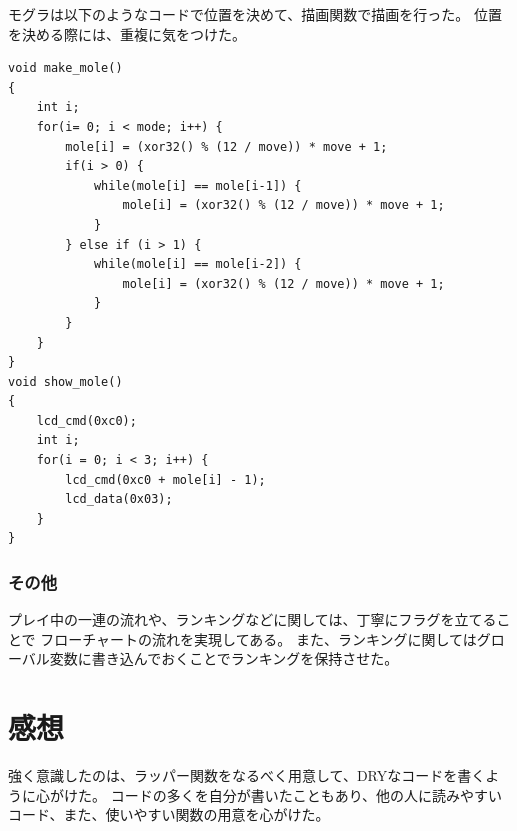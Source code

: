 \documentclass[11pt,a4j]{jsarticle}
\begin{document}
モグラは以下のようなコードで位置を決めて、描画関数で描画を行った。
位置を決める際には、重複に気をつけた。

\begin{lstlisting}[basicstyle=\ttfamily\footnotesize, frame=single]
void make_mole()
{
	int i;
	for(i= 0; i < mode; i++) {
		mole[i] = (xor32() % (12 / move)) * move + 1;
		if(i > 0) {
			while(mole[i] == mole[i-1]) {
				mole[i] = (xor32() % (12 / move)) * move + 1;
			}
		} else if (i > 1) {
			while(mole[i] == mole[i-2]) {
				mole[i] = (xor32() % (12 / move)) * move + 1;
			}
		}
	}
}
void show_mole()
{
	lcd_cmd(0xc0);
	int i;
	for(i = 0; i < 3; i++) {
		lcd_cmd(0xc0 + mole[i] - 1);
		lcd_data(0x03);
	}
}
\end{lstlisting}

\subsubsection{その他}
\label{subs:その他}

プレイ中の一連の流れや、ランキングなどに関しては、丁寧にフラグを立てることで
フローチャートの流れを実現してある。
また、ランキングに関してはグローバル変数に書き込んでおくことでランキングを保持させた。



\section{感想}
\label{sec:感想}

強く意識したのは、ラッパー関数をなるべく用意して、DRYなコードを書くように心がけた。
コードの多くを自分が書いたこともあり、他の人に読みやすいコード、また、使いやすい関数の用意を心がけた。
\end{document}
